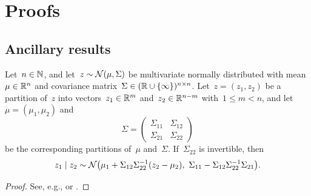\documentclass[11pt,oneside]{article}
\begin{document}
{
\raggedright


}

\appendix

\clearpage
\section{Proofs}
\label{sec:proofs}

\setcounter{lemma}{0}

\subsection{Ancillary results}

\begin{lemma}
    \label{lem:multivariate-normal-conditional}
    Let~$n\in\mathbb{N}$, and let~$z\sim\mathcal{N}(\mu,\Sigma)$ be multivariate normally distributed with mean~$\mu\in\mathbb{R}^n$ and covariance matrix~$\Sigma\in(\mathbb{R}\cup\{\infty\})^{n\times n}$.
    Let~$z=(z_1,z_2)$ be a partition of~$z$ into vectors~$z_1\in\mathbb{R}^m$ and~$z_2\in\mathbb{R}^{n-m}$ with~$1\le m<n$, and let~$\mu=(\mu_1,\mu_2)$ and
    \[ \Sigma=\begin{pmatrix}
        \Sigma_{11} & \Sigma_{12} \\
        \Sigma_{21} & \Sigma_{22}
    \end{pmatrix} \]
    be the corresponding partitions of~$\mu$ and~$\Sigma$.
    If~$\Sigma_{22}$ is invertible, then
    \[ z_1\mid z_2\sim\Ncal\left(\mu_1+\Sigma_{12}\Sigma_{22}^{-1}(z_2-\mu_2),\ \Sigma_{11}-\Sigma_{12}\Sigma_{22}^{-1}\Sigma_{21}\right). \]
\end{lemma}
%
\begin{proof}\let\qed\relax
    See, e.g., \citet[p.]{Bishop-2006-} or \citet[p.]{DeGroot-2004-}.
\end{proof}
\end{document}
